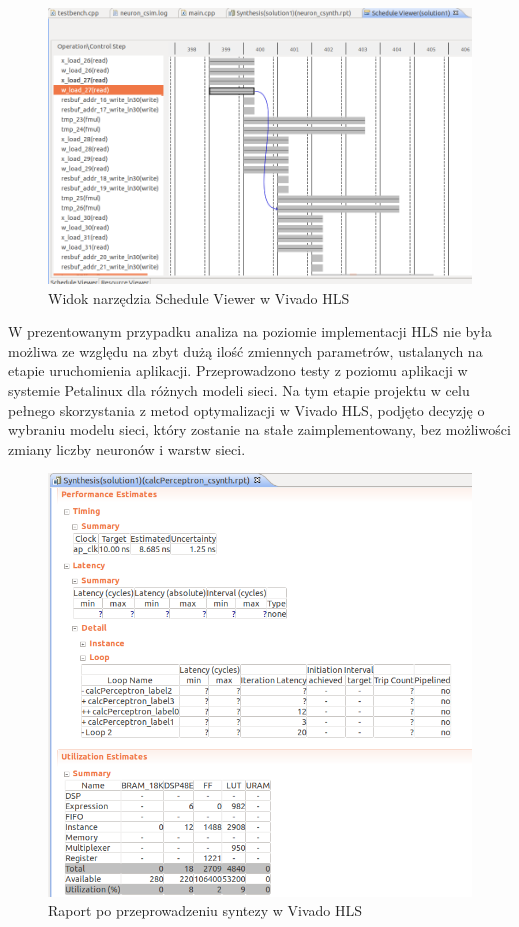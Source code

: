 \begin{figure}[!h]
  \centering
  \includegraphics[width=\textwidth]{img/scheduler.png}
  \caption{Widok narzędzia Schedule Viewer w Vivado HLS}
  \label{scheduler}
\end{figure}


W prezentowanym przypadku analiza na poziomie implementacji HLS nie była możliwa ze względu na zbyt dużą ilość zmiennych parametrów, ustalanych na etapie uruchomienia aplikacji. Przeprowadzono testy z poziomu aplikacji w systemie Petalinux dla różnych modeli sieci. Na tym etapie projektu w celu pełnego skorzystania z metod optymalizacji w Vivado HLS, podjęto decyzję o wybraniu modelu sieci, który zostanie na stałe zaimplementowany, bez możliwości zmiany liczby neuronów i warstw sieci.


\begin{figure}
  \centering
  \includegraphics[width=\textwidth]{img/hls-report.png}
  \caption{Raport po przeprowadzeniu syntezy w Vivado HLS}
  \label{hls-report}
\end{figure}

